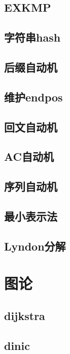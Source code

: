 \documentclass[10pt,a4paper]{article}
\begin{document}
\subsection{EXKMP}

\subsection{字符串hash}

\subsection{后缀自动机}

\subsection{维护endpos}

\subsection{回文自动机}

\subsection{AC自动机}

\subsection{序列自动机}

\subsection{最小表示法}

\subsection{Lyndon分解}

\section{图论}
\subsection{dijkstra}

\subsection{dinic}

\end{document}
